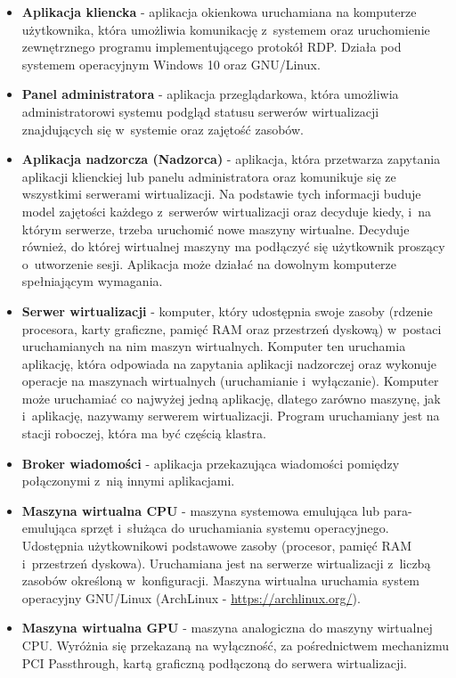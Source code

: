\documentclass[../wstep.tex]{subfiles}
\begin{document}
\begin{itemize}
  \item \textbf{Aplikacja kliencka} - aplikacja okienkowa uruchamiana na komputerze użytkownika, która umożliwia komunikację z~systemem oraz uruchomienie zewnętrznego programu implementującego protokół RDP. Działa pod systemem operacyjnym Windows 10 oraz GNU/Linux.
  \item \textbf{Panel administratora} - aplikacja przeglądarkowa, która umożliwia administratorowi systemu podgląd statusu serwerów wirtualizacji znajdujących się w~systemie oraz zajętość zasobów.
  \item \textbf{Aplikacja nadzorcza (Nadzorca)} - aplikacja, która przetwarza zapytania aplikacji klienckiej lub panelu administratora oraz komunikuje się ze wszystkimi serwerami wirtualizacji. Na podstawie tych informacji buduje model zajętości każdego z~serwerów wirtualizacji oraz decyduje kiedy, i~na którym serwerze, trzeba uruchomić nowe maszyny wirtualne. Decyduje również, do której wirtualnej maszyny ma podłączyć się użytkownik proszący o~utworzenie sesji. Aplikacja może działać na dowolnym komputerze spełniającym wymagania.
  \item \textbf{Serwer wirtualizacji} - komputer, który udostępnia swoje zasoby (rdzenie procesora, karty graficzne, pamięć RAM oraz przestrzeń dyskową) w~postaci uruchamianych na nim maszyn wirtualnych. Komputer ten uruchamia aplikację, która odpowiada na zapytania aplikacji nadzorczej oraz wykonuje operacje na maszynach wirtualnych (uruchamianie i~wyłączanie). Komputer może uruchamiać co najwyżej jedną aplikację, dlatego zarówno maszynę, jak i~aplikację, nazywamy serwerem wirtualizacji. Program uruchamiany jest na stacji roboczej, która ma być częścią klastra.
  \item \textbf{Broker wiadomości} - aplikacja przekazująca wiadomości pomiędzy połączonymi z~nią innymi aplikacjami.
  \item \textbf{Maszyna wirtualna CPU} - maszyna systemowa emulująca lub para-emulująca sprzęt i~służąca do uruchamiania systemu operacyjnego. Udostępnia użytkownikowi podstawowe zasoby (procesor, pamięć RAM i~przestrzeń dyskowa). Uruchamiana jest na serwerze wirtualizacji z~liczbą zasobów określoną w~konfiguracji. Maszyna wirtualna uruchamia system operacyjny GNU/Linux (ArchLinux - \url{https://archlinux.org/}).
  \item \textbf{Maszyna wirtualna GPU} - maszyna analogiczna do maszyny wirtualnej CPU. Wyróżnia się przekazaną na wyłączność, za pośrednictwem mechanizmu PCI Passthrough, kartą graficzną podłączoną do serwera wirtualizacji.

\end{itemize}
\end{document}
